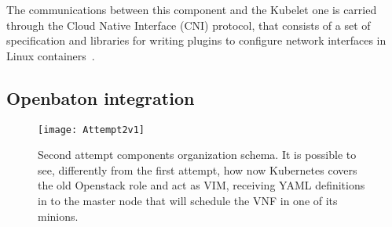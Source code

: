 \begin{description}
  The communications between this component and the Kubelet one is carried
  through the Cloud Native Interface (CNI) protocol, that consists of a set
  of specification and libraries for writing plugins to configure network
  interfaces in Linux containers~\cite{cnigithub}.
\end{description}

\subsection{Openbaton integration}

\begin{figure}[t]
  \centering
  \texttt{[image: Attempt2v1]}
  \caption[Second attempt components organization schema]{Second attempt
    components organization schema. It is possible to see, differently from the
    first attempt, how now Kubernetes covers the old Openstack role and act as
    VIM, receiving YAML definitions in to the master node that will schedule the
    VNF in one of its minions.}
  \label{chap:archimpl:sec:secondattempt:img:schema1}
\end{figure}

